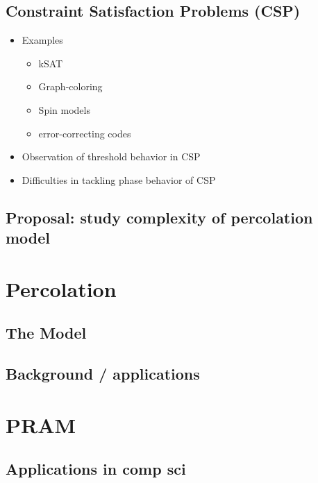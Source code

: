 \documentclass{umthesis}
\begin{document}
\subsection{Constraint Satisfaction Problems (CSP)}
\label{sec-4.1.1}
\begin{itemize}

\item Examples
\label{sec-4.1.1.1}%
\begin{itemize}

\item kSAT\\
\label{sec-4.1.1.1.1}%
\item Graph-coloring\\
\label{sec-4.1.1.1.2}%
\item Spin models\\
\label{sec-4.1.1.1.3}%
\item error-correcting codes\\
\label{sec-4.1.1.1.4}%
\end{itemize} %

\item Observation of threshold behavior in CSP\\
\label{sec-4.1.1.2}%
\item Difficulties in tackling phase behavior of CSP\\
\label{sec-4.1.1.3}%
\end{itemize} %
\subsection{Proposal: study complexity of percolation model}
\label{sec-4.1.2}
\section{Percolation}
\label{sec-4.2}
\subsection{The Model}
\label{sec-4.2.1}
\subsection{Background / applications}
\label{sec-4.2.2}
\section{PRAM}
\label{sec-4.3}
\subsection{Applications in comp sci}
\label{sec-4.3.1}
\end{document}
